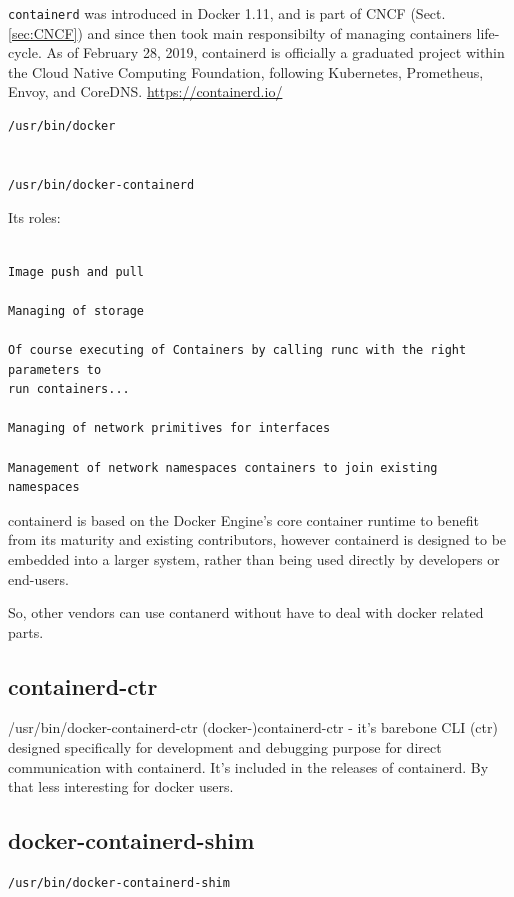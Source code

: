 \verb!containerd! was introduced in Docker 1.11, and is part of CNCF
(Sect.\ref{sec:CNCF}) and since then took main responsibilty of managing
containers life-cycle. As of February 28, 2019, containerd is officially a
graduated project within the Cloud Native Computing Foundation, following
Kubernetes, Prometheus, Envoy, and CoreDNS.
\url{https://containerd.io/}

\begin{verbatim}
/usr/bin/docker


/usr/bin/docker-containerd
\end{verbatim}

Its roles:
\begin{verbatim}

Image push and pull

Managing of storage

Of course executing of Containers by calling runc with the right parameters to
run containers...

Managing of network primitives for interfaces

Management of network namespaces containers to join existing namespaces

\end{verbatim}

containerd is based on the Docker Engine’s core container runtime to benefit
from its maturity and existing contributors, however containerd is designed to
be embedded into a larger system, rather than being used directly by developers
or end-users.

So, other vendors can use contanerd without have to deal with docker related
parts.

\subsection{containerd-ctr}

/usr/bin/docker-containerd-ctr (docker-)containerd-ctr - it's barebone CLI (ctr)
designed specifically for development and debugging purpose for direct
communication with containerd. It's included in the releases of containerd. By
that less interesting for docker users.

\subsection{docker-containerd-shim}

\begin{verbatim}
/usr/bin/docker-containerd-shim
\end{verbatim}

